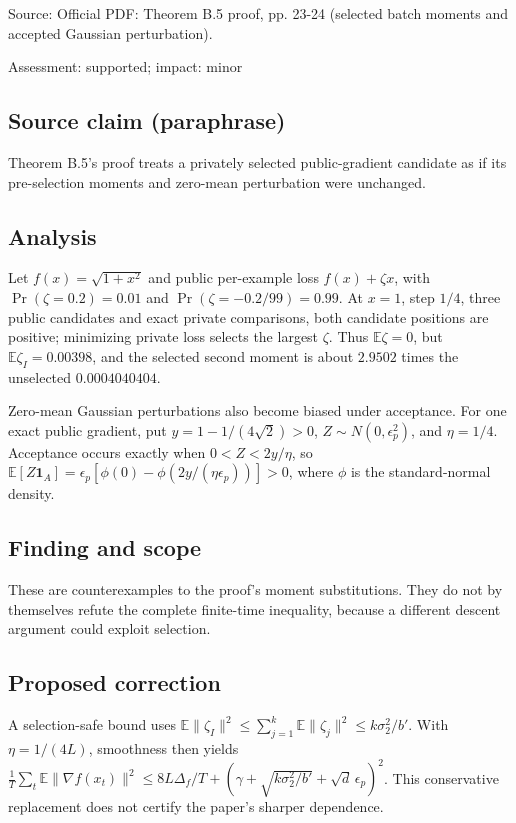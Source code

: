 \documentclass[11pt]{article}
\begin{document}
Source: Official PDF: Theorem B.5 proof, pp. 23-24 (selected batch moments and accepted Gaussian perturbation).

Assessment: supported; impact: minor

\subsection*{Source claim (paraphrase)}

Theorem B.5's proof treats a privately selected public-gradient candidate as if its pre-selection moments and zero-mean perturbation were unchanged.

\subsection*{Analysis}

Let \(f(x)=\sqrt{1+x^2}\) and public per-example loss \(f(x)+\zeta x\), with \(\Pr(\zeta=0.2)=0.01\) and \(\Pr(\zeta=-0.2/99)=0.99\). At \(x=1\), step \(1/4\), three public candidates and exact private comparisons, both candidate positions are positive; minimizing private loss selects the largest \(\zeta\). Thus \(\mathbb E\zeta=0\), but \(\mathbb E\zeta_I=0.00398\), and the selected second moment is about \(2.9502\) times the unselected \(0.0004040404\).

Zero-mean Gaussian perturbations also become biased under acceptance. For one exact public gradient, put \(y=1-1/(4\sqrt2)>0\), \(Z\sim N(0,\epsilon_p^2)\), and \(\eta=1/4\). Acceptance occurs exactly when \(0<Z<2y/\eta\), so \(\mathbb E[Z\mathbf1_A]=\epsilon_p[\phi(0)-\phi(2y/(\eta\epsilon_p))]>0\), where \(\phi\) is the standard-normal density.

\subsection*{Finding and scope}

These are counterexamples to the proof's moment substitutions. They do not by themselves refute the complete finite-time inequality, because a different descent argument could exploit selection.

\subsection*{Proposed correction}

A selection-safe bound uses \(\mathbb E\|\zeta_I\|^2\le\sum_{j=1}^k\mathbb E\|\zeta_j\|^2\le k\sigma_2^2/b'\). With \(\eta=1/(4L)\), smoothness then yields \(\frac1T\sum_t\mathbb E\|\nabla f(x_t)\|^2\le8L\Delta_f/T+(\gamma+\sqrt{k\sigma_2^2/b'}+\sqrt d\,\epsilon_p)^2\). This conservative replacement does not certify the paper's sharper dependence.
\end{document}
